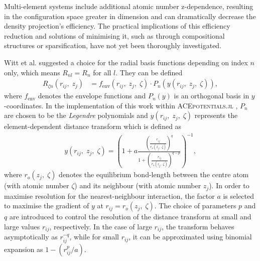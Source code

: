 Multi-element systems include additional atomic number z-dependence, resulting in the configuration space greater in dimension and can dramatically decrease the density projection's efficiency.  The practical implications of this efficiency reduction and solutions of minimising it, such as through compositional structures or sparsification, have not yet been thoroughly investigated.

Witt et al. \cite{Witt2023} suggested a choice for the radial basis functions depending on index $n$ only, which means $R_{nl}=R_{n}$ for all $l$.   
They can be defined 
\begin{equation} \label{equ:2.81}
\begin{split}
R_{\zeta n}(r_{ij},\;z_{j})
&= f_{\text{env}}(r_{ij},\;z_{j},\;\zeta)\cdot
P_{n}(y(r_{ij},\;z_{j},\;\zeta)),
\end{split}
\end{equation}
where $f_{\text{env}}$ denotes the envelope functions and $P_{n}(y)$ is an orthogonal basis in $y$-coordinates.
In the implementation of this work within \textsc{ACEpotentials.jl} \cite{Witt2023}, $P_{n}$ are chosen to be the \textit{Legendre} polynomials and $y(r_{ij},\;z_{j},\;\zeta)$ represents the element-dependent distance transform which is defined as
\begin{equation} \label{equ:2.82}
\begin{split}
y(r_{ij},\;z_{j},\;\zeta) =
\left(
1+a
\frac{\left(
    \frac{r_{ij}}{r_{o}(z_{j},\;\zeta)}
    \right)^{q}}
{1+\left(
    \frac{r_{ij}}{r_{o}(z_{j},\;\zeta)}
    \right)^{q-p}}
\right)^{-1},
\end{split}
\end{equation}
where $r_{o}(z_{j},\;\zeta)$ denotes the equilibrium bond-length between the centre atom (with atomic number $\zeta$) and its neighbour (with atomic number $z_{j}$).
In order to maximise resolution for the nearest-neighbour interaction, the factor $a$ is selected to maximise the gradient of $y$ at $r_{ij}=r_{o}(z_{j},\;\zeta)$.
The choice of parameters $p$ and $q$ are introduced to control the resolution of the distance transform at small and large values $r_{ij}$, respectively.
In the case of large $r_{ij}$, the transform behaves asymptotically as $r_{ij}^{-q}$, while for small $r_{ij}$, it can be approximated using binomial expansion as $1-(r_{ij}^{p}/a)$.

